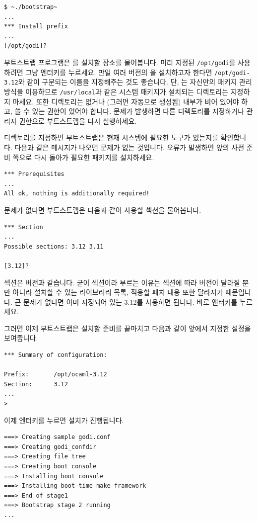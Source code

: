 \begin{lstlisting}
$ ~./bootstrap~
...
*** Install prefix
...
[/opt/godi]?
\end{lstlisting}

부트스트랩 프로그램은 \GODI{}를 설치할 장소를 물어봅니다. 미리 지정된
\texttt{/opt/godi}를 사용하려면 그냥 엔터키를 누르세요. 만일 여러 버전의
\OCAML{}을 설치하고자 한다면 \texttt{/opt/godi-3.12}와 같이 구분되는 이름을
지정해주는 것도 좋습니다. 단, \GODI{}는 자신만의 패키지 관리 방식을
이용하므로 \texttt{/usr/local}과 같은 시스템 패키지가 설치되는 디렉토리는
지정하지 마세요. 또한 디렉토리는 없거나 (그러면 자동으로 생성됨) 내부가 비어
있어야 하고, 쓸 수 있는 권한이 있어야 합니다. 문제가 발생하면 다른 디렉토리를
지정하거나 관리자 권한으로 부트스트랩을 다시 실행하세요.

디렉토리를 지정하면 부트스트랩은 현재 시스템에 필요한 도구가 있는지를
확인합니다. 다음과 같은 메시지가 나오면 문제가 없는 것입니다. 오류가 발생하면
앞의 사전 준비 쪽으로 다시 돌아가 필요한 패키지를 설치하세요.

\begin{lstlisting}
*** Prerequisites
...
All ok, nothing is additionally required!
\end{lstlisting}

문제가 없다면 부트스트랩은 다음과 같이 사용할 섹션을 물어봅니다.

\begin{lstlisting}
*** Section
...
Possible sections: 3.12 3.11

[3.12]?
\end{lstlisting}

섹션은 \OCAML{} 버전과 같습니다. 굳이 섹션이라 부르는 이유는 섹션에 따라
\OCAML{} 버전이 달라질 뿐만 아니라 설치할 수 있는 라이브러리 목록, 적용할 패치
내용 또한 달라지기 때문입니다. 큰 문제가 없다면 이미 지정되어 있는 3.12를
사용하면 됩니다. 바로 엔터키를 누르세요.

그러면 이제 부트스트랩은 설치할 준비를 끝마치고 다음과 같이 앞에서 지정한
설정을 보여줍니다.

\begin{lstlisting}
*** Summary of configuration:

Prefix:       /opt/ocaml-3.12
Section:      3.12
...
>
\end{lstlisting}

이제 엔터키를 누르면 설치가 진행됩니다.

\begin{lstlisting}
===> Creating sample godi.conf
===> Creating godi_confdir
===> Creating file tree
===> Creating boot console
===> Installing boot console
===> Installing boot-time make framework
===> End of stage1
===> Bootstrap stage 2 running
...
\end{lstlisting}

